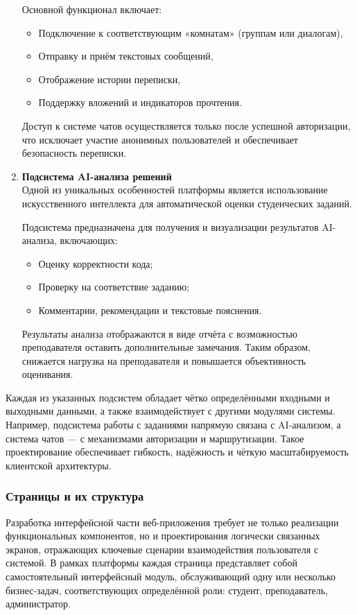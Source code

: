 \begin{enumerate}
  Основной функционал включает:
  \begin{itemize}
    \item Подключение к соответствующим «комнатам» (группам или диалогам),
    \item Отправку и приём текстовых сообщений,
    \item Отображение истории переписки,
    \item Поддержку вложений и индикаторов прочтения.
  \end{itemize}
  
  Доступ к системе чатов осуществляется только после успешной авторизации, что исключает участие анонимных пользователей и обеспечивает безопасность переписки.

  \item \textbf{Подсистема AI-анализа решений}\\
  Одной из уникальных особенностей платформы является использование искусственного интеллекта для автоматической оценки студенческих заданий.
  
  Подсистема предназначена для получения и визуализации результатов AI-анализа, включающих:
  \begin{itemize}
    \item Оценку корректности кода;
    \item Проверку на соответствие заданию;
    \item Комментарии, рекомендации и текстовые пояснения.
  \end{itemize}
  
  Результаты анализа отображаются в виде отчёта с возможностью преподавателя оставить дополнительные замечания. Таким образом, снижается нагрузка на преподавателя и повышается объективность оценивания.

\end{enumerate}

Каждая из указанных подсистем обладает чётко определёнными входными и выходными данными, а также взаимодействует с другими модулями системы. Например, подсистема работы с заданиями напрямую связана с AI-анализом, а система чатов — с механизмами авторизации и маршрутизации. Такое проектирование обеспечивает гибкость, надёжность и чёткую масштабируемость клиентской архитектуры.

\subsubsection{Страницы и их структура}

Разработка интерфейсной части веб-приложения требует не только реализации функциональных компонентов, но и проектирования логически связанных экранов, отражающих ключевые сценарии взаимодействия пользователя с системой. В рамках платформы каждая страница представляет собой самостоятельный интерфейсный модуль, обслуживающий одну или несколько бизнес-задач, соответствующих определённой роли: студент, преподаватель, администратор.

